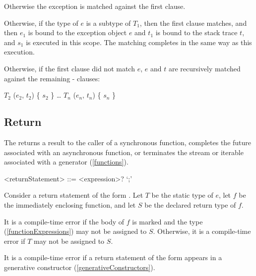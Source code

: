 \documentclass[makeidx]{article}
\begin{document}
{\LMHash{}%
Otherwise the exception is matched against the first clause.

\LMHash{}%
Otherwise, if the type of $e$ is a subtype of $T_1$, then the first clause matches, and then $e_1$ is bound to the exception object $e$ and $t_1$ is bound to the stack trace $t$, and $s_1$ is executed in this scope.
The matching completes in the same way as this execution.

\LMHash{}%
Otherwise, if the first clause did not match $e$, $e$ and $t$ are recursively matched against the remaining \ON{}-\CATCH{} clauses:

\begin{dartCode}
\ON{} $T_2$ \CATCH{} ($e_2$, $t_2$) \{ $s_2$ \}
\ldots
\ON{} $T_n$ \CATCH{} ($e_n$, $t_n$) \{ $s_n$ \}
\end{dartCode}


\subsection{Return}

\LMHash{}%
The  returns a result to the caller of a synchronous function,
completes the future associated with an asynchronous function,
or terminates the stream or iterable associated with a generator (\ref{functions}).

\begin{grammar}
<returnStatement> ::= \RETURN{} <expression>? `;'
\end{grammar}

\LMHash{}%
Consider a return statement of the form .
Let $T$ be the static type of $e$, let $f$ be the immediately enclosing function,
and let $S$ be the declared return type of $f$.

\LMHash{}%
It is a compile-time error if the body of $f$ is marked \ASYNC{}
and the type  (\ref{functionExpressions}) may not be assigned to $S$.
Otherwise, it is a compile-time error if $T$ may not be assigned to $S$.

\LMHash{}%
It is a compile-time error if a return statement of the form  appears in a generative constructor (\ref{generativeConstructors}).


}
\end{document}
